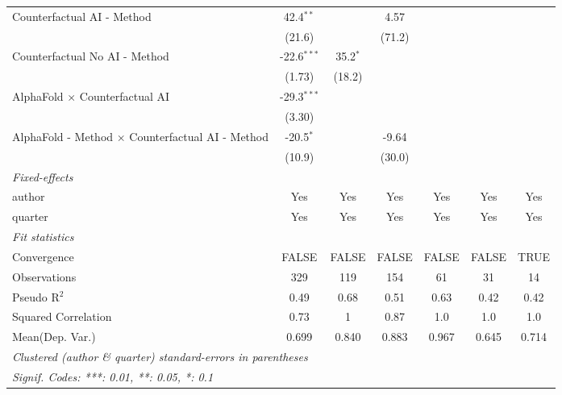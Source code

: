 \begin{tabular}{lcccccc}
   Counterfactual AI - Method                              & 42.4$^{**}$   &                & 4.57         &              &         &   \\   
                                                           & (21.6)        &                & (71.2)       &              &         &   \\   
   Counterfactual No AI - Method                           & -22.6$^{***}$ & 35.2$^{*}$     &              &              &         &   \\   
                                                           & (1.73)        & (18.2)         &              &              &         &   \\   
   AlphaFold $\times$ Counterfactual AI                    & -29.3$^{***}$ &                &              &              &         &   \\   
                                                           & (3.30)        &                &              &              &         &   \\   
   AlphaFold - Method $\times$ Counterfactual AI - Method  & -20.5$^{*}$   &                & -9.64        &              &         &   \\   
                                                           & (10.9)        &                & (30.0)       &              &         &   \\   
   \midrule
   \emph{Fixed-effects}\\
   author                                                  & Yes           & Yes            & Yes          & Yes          & Yes     & Yes\\  
   quarter                                                 & Yes           & Yes            & Yes          & Yes          & Yes     & Yes\\  
   \midrule
   \emph{Fit statistics}\\
   Convergence                                             &FALSE          & FALSE          & FALSE        & FALSE        & FALSE   & TRUE\\  
   Observations                                            & 329           & 119            & 154          & 61           & 31      & 14\\  
   Pseudo R$^2$                                            & 0.49          & 0.68           & 0.51         & 0.63         & 0.42    & 0.42\\  
   Squared Correlation                                     & 0.73          & 1              & 0.87         & 1.0          & 1.0     & 1.0\\  
Mean(Dep. Var.) & 0.699 & 0.840 & 0.883 & 0.967 & 0.645 & 0.714 \\
   \midrule \midrule
   \multicolumn{7}{l}{\emph{Clustered (author \& quarter) standard-errors in parentheses}}\\
   \multicolumn{7}{l}{\emph{Signif. Codes: ***: 0.01, **: 0.05, *: 0.1}}\\
\end{tabular}
\par\endgroup
